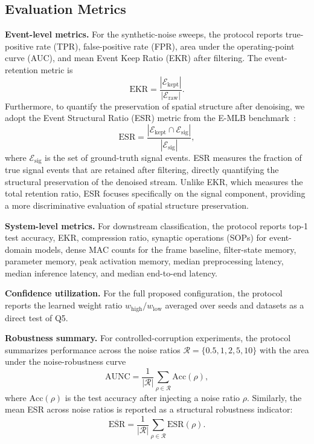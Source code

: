 \documentclass[a4paper,fleqn]{cas-dc}
\begin{document}
\subsection{Evaluation Metrics}

\textbf{Event-level metrics.} For the synthetic-noise sweeps, the protocol reports true-positive rate (TPR), false-positive rate (FPR), area under the operating-point curve (AUC), and mean Event Keep Ratio (EKR) after filtering. The event-retention metric is
\begin{equation}
\text{EKR} = \frac{|\mathcal{E}_{\text{kept}}|}{|\mathcal{E}_{\text{raw}}|}.
\label{eq:ekr}
\end{equation}
Furthermore, to quantify the preservation of spatial structure after denoising, we adopt the Event Structural Ratio (ESR) metric from the E-MLB benchmark~\citep{ding2023emlb}:
\begin{equation}
\text{ESR} = \frac{|\mathcal{E}_{\text{kept}} \cap \mathcal{E}_{\text{sig}}|}{|\mathcal{E}_{\text{sig}}|},
\label{eq:esr}
\end{equation}
where $\mathcal{E}_{\text{sig}}$ is the set of ground-truth signal events. ESR measures the fraction of true signal events that are retained after filtering, directly quantifying the structural preservation of the denoised stream. Unlike EKR, which measures the total retention ratio, ESR focuses specifically on the signal component, providing a more discriminative evaluation of spatial structure preservation.

\textbf{System-level metrics.} For downstream classification, the protocol reports top-1 test accuracy, EKR, compression ratio, synaptic operations (SOPs) for event-domain models, dense MAC counts for the frame baseline, filter-state memory, parameter memory, peak activation memory, median preprocessing latency, median inference latency, and median end-to-end latency.

\textbf{Confidence utilization.} For the full proposed configuration, the protocol reports the learned weight ratio $w_{\text{high}}/w_{\text{low}}$ averaged over seeds and datasets as a direct test of Q5.

\textbf{Robustness summary.} For controlled-corruption experiments, the protocol summarizes performance across the noise ratios $\mathcal{R}=\{0.5,1,2,5,10\}$ with the area under the noise-robustness curve
\begin{equation}
\text{AUNC} = \frac{1}{|\mathcal{R}|}\sum_{\rho\in\mathcal{R}} \text{Acc}(\rho),
\label{eq:aunc}
\end{equation}
where $\text{Acc}(\rho)$ is the test accuracy after injecting a noise ratio $\rho$. Similarly, the mean ESR across noise ratios is reported as a structural robustness indicator:
\begin{equation}
\overline{\text{ESR}} = \frac{1}{|\mathcal{R}|}\sum_{\rho\in\mathcal{R}} \text{ESR}(\rho).
\label{eq:mean_esr}
\end{equation}
\end{document}
